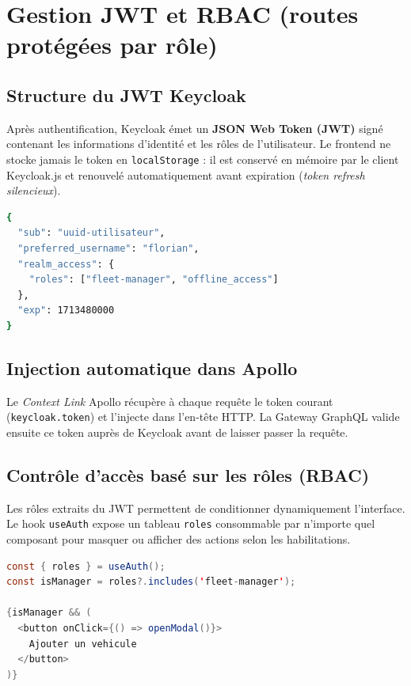 \documentclass[12pt,a4paper]{article}
\begin{document}
\section{Gestion JWT et RBAC (routes prot\'{e}g\'{e}es par r\^{o}le)}

\subsection{Structure du JWT Keycloak}

Apr\`{e}s authentification, Keycloak \'{e}met un \textbf{JSON Web Token (JWT)} sign\'{e} contenant les informations d'identit\'{e} et les r\^{o}les de l'utilisateur. Le frontend ne stocke jamais le token en \texttt{localStorage} : il est conserv\'{e} en m\'{e}moire par le client Keycloak.js et renouvel\'{e} automatiquement avant expiration (\textit{token refresh silencieux}).

\begin{lstlisting}[language=bash, caption=Extrait d'un payload JWT Keycloak d\'{e}cod\'{e}]
{
  "sub": "uuid-utilisateur",
  "preferred_username": "florian",
  "realm_access": {
    "roles": ["fleet-manager", "offline_access"]
  },
  "exp": 1713480000
}
\end{lstlisting}

\subsection{Injection automatique dans Apollo}

Le \textit{Context Link} Apollo r\'{e}cup\`{e}re \`{a} chaque requ\^{e}te le token courant (\texttt{keycloak.token}) et l'injecte dans l'en-t\^{e}te HTTP. La Gateway GraphQL valide ensuite ce token aupr\`{e}s de Keycloak avant de laisser passer la requ\^{e}te.

\subsection{Contr\^{o}le d'acc\`{e}s bas\'{e} sur les r\^{o}les (RBAC)}

Les r\^{o}les extraits du JWT permettent de conditionner dynamiquement l'interface. Le hook \texttt{useAuth} expose un tableau \texttt{roles} consommable par n'importe quel composant pour masquer ou afficher des actions selon les habilitations.

\begin{lstlisting}[language=Java, caption=Affichage conditionnel selon le r\^{o}le]
const { roles } = useAuth();
const isManager = roles?.includes('fleet-manager');

{isManager && (
  <button onClick={() => openModal()}>
    Ajouter un vehicule
  </button>
)}
\end{lstlisting}
\end{document}
